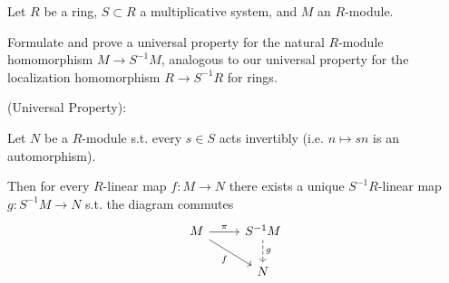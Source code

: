 \documentclass[12pt, letterpaper]{article}
\begin{document}
\color{\TextColor}
\pagecolor{\colormode}
\setlength{\parindent}{0pt}
\pagestyle{fancy}
\fancyhf{}

\begin{problem}{}
    Let $R$ be a ring, $S \subset R$ a multiplicative system, and $M$ an $R$-module.
\end{problem}
\begin{subproblem}{}
    Formulate and prove a universal property for the natural $R$-module homomorphism $M \to S^{-1}M$, analogous to our universal
    property for the localization homomorphism $R \to S^{-1}R$ for rings.

    (Universal Property):

    Let $N$ be a $R$-module s.t. every $s \in S$ acts invertibly (i.e. $n \mapsto sn$ is an automorphism).

    Then for every $R$-linear map $f: M \to N$ there exists a unique $S^{-1}R$-linear map $g: S^{-1}M \to N$ s.t. the diagram commutes
    \[\begin{tikzcd}
	M & {S^{-1}M} \\
	& N
	\arrow["\pi", from=1-1, to=1-2]
	\arrow["f"', from=1-1, to=2-2]
	\arrow["g", dashed, from=1-2, to=2-2]
    \end{tikzcd}\]
\end{subproblem}
\end{document}
